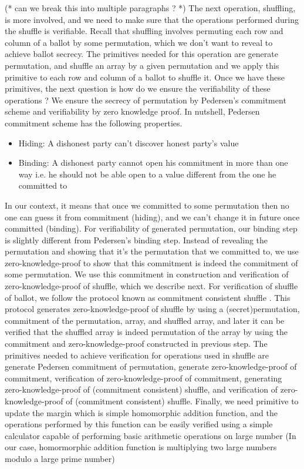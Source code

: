 \documentclass{llncs}
\begin{document}
(* can we break this into multiple paragraphs ? *)
The next operation, shuffling, 
is more involved, and we need to make 
sure that the operations performed during the shuffle is verifiable. Recall
that shuffling involves permuting each row and column of a ballot 
by some permutation, which we don't want to reveal to achieve 
ballot secrecy. The primitives needed for this operation are 
generate permutation, and shuffle an array by a given permutation and we 
apply this primitive to each row and column of a ballot to shuffle it. 
Once we have these primitives, the next question is how do we 
ensure the verifiability of these operations ? We ensure the secrecy of
permutation by  Pedersen's commitment scheme\cite{Pederson} 
and verifiability  by zero knowledge proof. In nutshell, Pedersen commitment 
scheme has the following properties. 
\begin{itemize}
\item Hiding: A dishonest party can't discover honest party's value 
\item Binding: A dishonest party cannot open his commitment in more  
	 	than one way i.e. he should not be able open to a value 
	 	different from the one he committed to 
\end{itemize}
In our context, it means that once we committed to some permutation then 
no one can guess it from commitment (hiding), and we can't change it in future 
once committed (binding). For verifiability of generated permutation, 
our binding step is slightly different from 
Pedersen's binding step. Instead of revealing the permutation 
and showing
that it's the permutation that we committed to, we use zero-knowledge-proof
to show that this commitment is indeed the commitment of some permutation.
We use this commitment in construction and verification of 
zero-knowledge-proof of shuffle, which we describe next. 
For verification of shuffle of ballot, we follow  the protocol 
known as commitment consistent shuffle \cite{Wikstrom:2009:CPS}. 
This protocol generates zero-knowledge-proof of shuffle by 
using a (secret)permutation, commitment of the permutation, array, and 
shuffled array,  and later it can be verified that the shuffled array 
is indeed  permutation of the array by using the commitment and 
zero-knowledge-proof constructed in previous step. 
The primitives needed to achieve verification for operations used in shuffle 
are generate Pedersen commitment of permutation, generate 
zero-knowledge-proof of commitment, 
verification of zero-knowledge-proof of commitment, 
generating zero-knowledge-proof of (commitment consistent) shuffle, 
     and verification of zero-knowledge-proof of 
     (commitment consistent) shuffle.  
Finally, we need primitive to update the margin which is simple homomorphic
addition function, and the operations performed by this function 
 can be easily verified using a simple calculator capable of performing 
 basic arithmetic operations on large number (In our case, homormorphic 
 addition function is multiplying two large numbers modulo a large prime 
 number)
\end{document}
